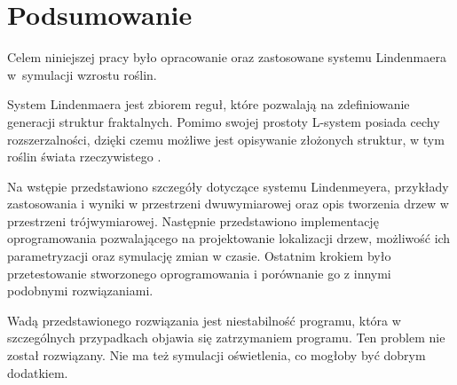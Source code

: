 \documentclass[a4paper,twoside,12pt]{report}
\begin{document}
\chapter*{Podsumowanie}

Celem niniejszej pracy było opracowanie oraz 
zastosowane systemu Lindenmaera w~symulacji
wzrostu roślin.

System Lindenmaera jest zbiorem reguł, które pozwalają na 
zdefiniowanie generacji struktur fraktalnych. Pomimo 
swojej prostoty L-system posiada cechy rozszerzalności, 
dzięki czemu możliwe jest opisywanie złożonych struktur, 
w tym roślin świata rzeczywistego \cite{impactsOnTheorCompSci}.

Na wstępie przedstawiono szczegóły dotyczące systemu Lindenmeyera, 
przykłady zastosowania i wyniki w przestrzeni dwuwymiarowej oraz 
opis tworzenia drzew w przestrzeni trójwymiarowej. 
Następnie przedstawiono implementację oprogramowania 
pozwalającego na projektowanie lokalizacji drzew, 
możliwość ich parametryzacji oraz symulację zmian w czasie.
Ostatnim krokiem było przetestowanie stworzonego oprogramowania 
i porównanie go z innymi podobnymi rozwiązaniami.

Wadą przedstawionego rozwiązania jest niestabilność programu, 
która w szczególnych przypadkach objawia się zatrzymaniem programu. 
Ten problem nie został rozwiązany.
Nie ma też symulacji oświetlenia, co mogłoby być dobrym dodatkiem.



\end{document}
